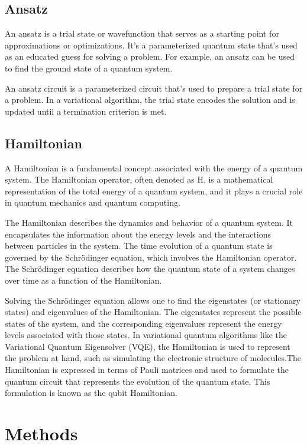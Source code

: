 \documentclass{article}
\begin{document}
\subsection{Ansatz}

An ansatz is a trial state or wavefunction that serves as a starting point for approximations or optimizations. It's a parameterized quantum state that's used as an educated guess for solving a problem. For example, an ansatz can be used to find the ground state of a quantum system.

An ansatz circuit is a parameterized circuit that's used to prepare a trial state for a problem. In a variational algorithm, the trial state encodes the solution and is updated until a termination criterion is met. 

\subsection{Hamiltonian}
A Hamiltonian is a fundamental concept associated with the energy of a quantum system. The Hamiltonian operator, often denoted as H, is a mathematical representation of the total energy of a quantum system, and it plays a crucial role in quantum mechanics and quantum computing. 

The Hamiltonian describes the dynamics and behavior of a quantum system. It encapsulates the information about the energy levels and the interactions between particles in the system. The time evolution of a quantum state is governed by the Schrödinger equation, which involves the Hamiltonian operator. The Schrödinger equation describes how the quantum state of a system changes over time as a function of the Hamiltonian.

Solving the Schrödinger equation allows one to find the eigenstates (or stationary states) and eigenvalues of the Hamiltonian. The eigenstates represent the possible states of the system, and the corresponding eigenvalues represent the energy levels associated with those states. In variational quantum algorithms like the Variational Quantum Eigensolver (VQE), the Hamiltonian is used to represent the problem at hand, such as simulating the electronic structure of molecules.The Hamiltonian is expressed in terms of Pauli matrices and used to formulate the quantum circuit that represents the evolution of the quantum state. This formulation is known as the qubit Hamiltonian.

\section{Methods}
\end{document}
